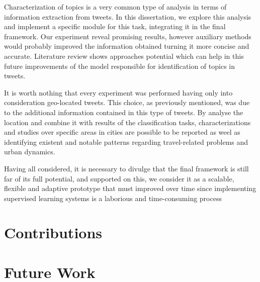 Characterization of topics is a very common type of analysis in terms of information extraction from tweets. In this dissertation, we explore this analysis and implement a specific module for this task, integrating it in the final framework. Our experiment reveal promising results, however auxiliary methods would probably improved the information obtained turning it more concise and accurate. Literature review shows approaches potential which can help in this future improvements of the model responsible for identification of topics in tweets.

It is worth nothing that every experiment was performed having only into consideration geo-located tweets. This choice, as previously mentioned, was due to the additional information contained in this type of tweets. By analyse the location and combine it with results of the classification tasks, characterizations and studies over specific areas in cities are possible to be reported as weel as identifying existent and notable patterns regarding travel-related problems and urban dynamics.

Having all considered, it is necessary to divulge that the final framework is still far of its full potential, and supported on this, we consider it as a scalable, flexible and adaptive prototype that must improved over time since implementing supervised learning systems is a laborious and time-consuming process

\section{Contributions}


\section{Future Work}

